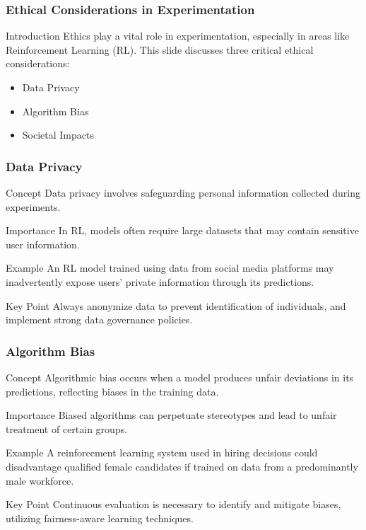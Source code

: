 \documentclass[aspectratio=169]{beamer}
\begin{document}
\begin{frame}[fragile]
    \frametitle{Ethical Considerations in Experimentation}
    \begin{block}{Introduction}
        Ethics play a vital role in experimentation, especially in areas like Reinforcement Learning (RL). This slide discusses three critical ethical considerations:
    \end{block}
    \begin{itemize}
        \item Data Privacy
        \item Algorithm Bias
        \item Societal Impacts
    \end{itemize}
\end{frame}

\begin{frame}[fragile]
    \frametitle{Data Privacy}
    \begin{block}{Concept}
        Data privacy involves safeguarding personal information collected during experiments.
    \end{block}
    \begin{block}{Importance}
        In RL, models often require large datasets that may contain sensitive user information.
    \end{block}
    \begin{block}{Example}
        An RL model trained using data from social media platforms may inadvertently expose users' private information through its predictions.
    \end{block}
    \begin{block}{Key Point}
        Always anonymize data to prevent identification of individuals, and implement strong data governance policies.
    \end{block}
\end{frame}

\begin{frame}[fragile]
    \frametitle{Algorithm Bias}
    \begin{block}{Concept}
        Algorithmic bias occurs when a model produces unfair deviations in its predictions, reflecting biases in the training data.
    \end{block}
    \begin{block}{Importance}
        Biased algorithms can perpetuate stereotypes and lead to unfair treatment of certain groups.
    \end{block}
    \begin{block}{Example}
        A reinforcement learning system used in hiring decisions could disadvantage qualified female candidates if trained on data from a predominantly male workforce.
    \end{block}
    \begin{block}{Key Point}
        Continuous evaluation is necessary to identify and mitigate biases, utilizing fairness-aware learning techniques.
    \end{block}
\end{frame}
\end{document}
